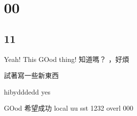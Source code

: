 
\chapter{00}

\section{11}

Yeah!
This
GOod thing! 知道嗎？
，好煩

試著寫一些新東西

hibydddedd
yes

GOod
希望成功
local
uu
sst
1232
overl
000